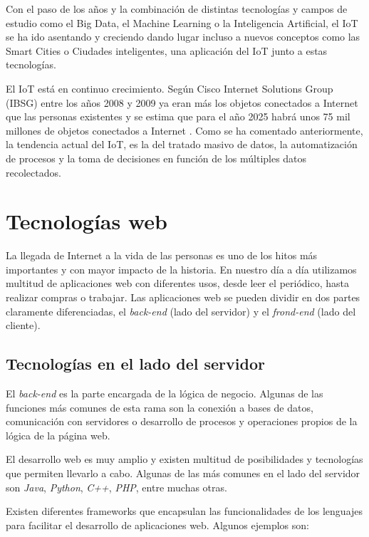 \documentclass[a4paper, 12pt, oneside]{book}
\begin{document}
Con el paso de los años y la combinación de distintas tecnologías y campos de estudio como el Big Data, el Machine Learning o la Inteligencia Artificial, el IoT se ha ido asentando y creciendo dando lugar incluso a nuevos conceptos como las Smart Cities o Ciudades inteligentes, una aplicación del IoT junto a estas tecnologías.

El IoT está en continuo crecimiento. Según Cisco Internet Solutions Group (IBSG) entre los años 2008 y 2009 ya eran más los objetos conectados a Internet que las personas existentes y se estima que para el año 2025 habrá unos 75 mil millones de objetos conectados a Internet \cite{cisco_iot}. Como se ha comentado anteriormente, la tendencia actual del IoT, es la del tratado masivo de datos, la automatización de procesos y la toma de decisiones en función de los múltiples datos recolectados.

\section{Tecnologías web}
\label{sec:tecnologías web}
La llegada de Internet a la vida de las personas es uno de los hitos más importantes y con mayor impacto de la historia. En nuestro día a día utilizamos multitud de aplicaciones web con diferentes usos, desde leer el periódico, hasta realizar compras o trabajar.
Las aplicaciones web se pueden dividir en dos partes claramente diferenciadas, el \textit{back-end} (lado del servidor) y el \textit{frond-end} (lado del cliente).

\subsection{Tecnologías en el lado del servidor}
\label{subsec:tecnologías en el lado del servidor}
 El \textit{back-end} es la parte encargada de la lógica de negocio. Algunas de las funciones más comunes de esta rama son la conexión a bases de datos, comunicación con servidores o desarrollo de procesos y operaciones propios de la lógica de la página web.
 
El desarrollo web es muy amplio y existen multitud de posibilidades y tecnologías que permiten llevarlo a cabo. Algunas de las más comunes en el lado del servidor son \textit{Java},  \textit{Python}, \textit{C++}, \textit{PHP}, entre muchas otras.

Existen diferentes frameworks que encapsulan las funcionalidades de los lenguajes para facilitar el desarrollo de aplicaciones web. Algunos ejemplos son:
\end{document}
